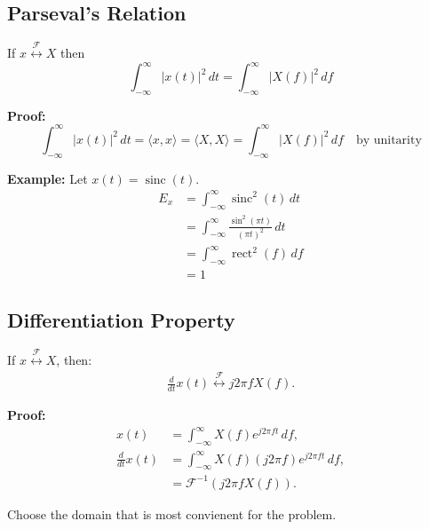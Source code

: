 \subsection{Parseval's Relation}
\begin{definition}
    If \( x \overset{\mathcal{F}}{\leftrightarrow} X \) then
    \[
    \int_{-\infty}^{\infty} |x(t)|^2 \, dt = \int_{-\infty}^{\infty} |X(f)|^2 \, df
    \]
\end{definition}

\begin{derivation}
    \textbf{Proof:}
    \[
    \int_{-\infty}^{\infty} |x(t)|^2 \, dt = \langle x, x \rangle = \langle X, X \rangle = \int_{-\infty}^{\infty} |X(f)|^2 \, df \quad \text{by unitarity}
    \]
\end{derivation}

\begin{example}
    \textbf{Example:}
    Let \( x(t) = \operatorname{sinc}(t) \).
    \begin{align*}
        E_x &= \int_{-\infty}^{\infty} \operatorname{sinc}^2(t) \, dt \\ 
        &= \int_{-\infty}^{\infty} \frac{\sin^2(\pi t)}{(\pi t)^2} \, dt \\
        &= \int_{-\infty}^{\infty} \operatorname{rect}^2(f) \, df \\
        &= 1
    \end{align*}
\end{example}

\subsection{Differentiation Property}
\begin{definition}
    If \( x \overset{\mathcal{F}}{\leftrightarrow} X \), then:
    \begin{align*}
    \frac{d}{dt} x(t) \overset{\mathcal{F}}{\leftrightarrow} j2\pi f X(f).
    \end{align*}
\end{definition}

\begin{derivation}
    \textbf{Proof:}
    \begin{align*}
    x(t) &= \int_{-\infty}^{\infty} X(f) e^{j 2 \pi f t} \, df, \\
    \frac{d}{dt} x(t) &= \int_{-\infty}^{\infty} X(f) \left( j 2 \pi f \right) e^{j 2 \pi f t} \, df, \\
    &= \mathcal{F}^{-1} \left( j 2 \pi f X(f) \right).
    \end{align*}
\end{derivation}

\begin{warning}
    Choose the domain that is most convienent for the problem.
\end{warning}
